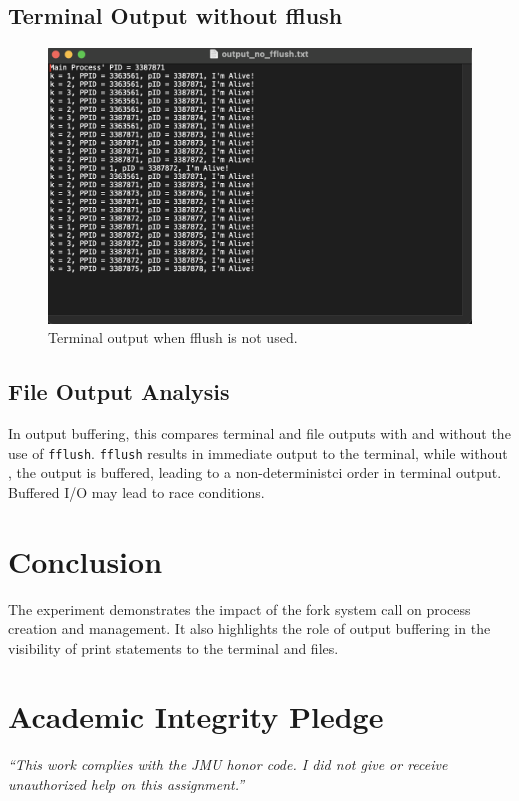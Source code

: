 \documentclass[12pt]{article}
\begin{document}
\newpage
  \subsection{Terminal Output without fflush}
  \begin{figure}[h]
    \centering
    \includegraphics[width=17cm]{output_no_fflush.png}
    \caption{Terminal output when fflush is not used.}
  \end{figure}

\subsection{File Output Analysis}
In output buffering, this compares terminal and file outputs with and without the use of \texttt{fflush}. \texttt{fflush} results in immediate output to the terminal, while without , the output is buffered, leading to a non-deterministci order in terminal output. Buffered I/O may lead to race conditions. 

\section{Conclusion}
The experiment demonstrates the impact of the fork system call on process creation and management. It also highlights the role of output buffering in the visibility of print statements to the terminal and files.

\vfill
  \section*{Academic Integrity Pledge}
    {\color{red}\textit{“This work complies with the JMU honor code. I did not give or receive unauthorized help on this assignment.”}}
\end{document}

